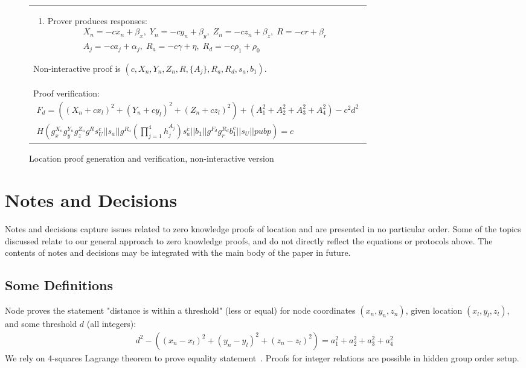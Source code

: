 \documentclass{article}
\begin{document}
\begin{figure}[!htb]
\begin{tabular}{|p{\linewidth}|}
\begin{enumerate}
\item
  Prover produces responses:
\begin{multline}
  X_n = -c x_n + \beta_x,  \;
  Y_n = -c y_n + \beta_y,  \;
  Z_n = -c z_n + \beta_z,   \;
  R = -c r + \beta_r   \\
  A_j = -c a_j + \alpha_j, \;
  R_a = -c \gamma + \eta,   \;
  R_d = -c \rho_1 + \rho_0
\end{multline}
\end{enumerate}
Non-interactive proof is
$(c, X_n, Y_n, Z_n, R, \{A_j\}, R_a, R_d, s_a, b_1)$.
\\
Proof verification:
\begin{multline}
\label{verf-chash}
  F_d = ((X_n + c x_l)^2 + (Y_n + c y_l)^2 + (Z_n + c z_l)^2) + (A_1^2 + A_2^2 + A_3^2 + A_4^2) - c^2 d^2 \\
  H(g_x^{X_n} g_y^{Y_n} g_z^{Z_n} g^{R} s_U^{c} ||
    s_a ||
    g^{R_a} (\prod_{j=1}^4 h_j^{A_j}) s_a^{c} ||
    b_1 ||
    g^{F_d} g_r^{R_d} b_1^c ||
    s_U ||
    pubp)
  = c
\end{multline}
\\
\hline
\end{tabular}
\caption{Location proof generation and verification, non-interactive version}
\label{ni_fig}
\end{figure}



\section{Notes and Decisions}

Notes and decisions capture issues related to zero knowledge proofs of location and are presented in no particular order. Some of the topics discussed relate to our general approach to zero knowledge proofs, and do not directly reflect the equations or protocols above. The contents of notes and decisions may be integrated with the main body of the paper in future. 

\subsection{Some Definitions}
\label{sect-definitions}
Node proves the statement "distance is within a threshold" (less or equal)
for node coordinates $(x_n, y_n, z_n)$,
given location $(x_l, y_l, z_l)$,
and some threshold $d$ (all integers):
\begin{gather}
\label{eq-distn-cp}
  d^2 - ((x_n - x_l)^2 + (y_n - y_l)^2 + (z_n - z_l)^2) = a_1^2 + a_2^2 + a_3^2 + a_4^2
\end{gather}
We rely on 4-squares Lagrange theorem to prove equality statement~\cite{Lipmaa03}.
Proofs for integer relations are possible in hidden group order setup.
\end{document}
